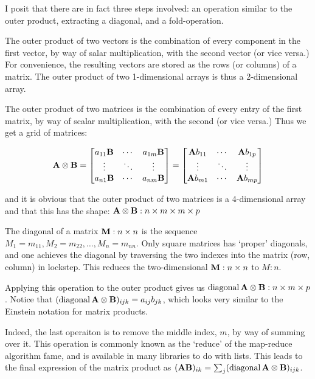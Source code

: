 \documentclass[a4paper,11pt,notitlepage]{article}
\begin{document}
I posit that there are in fact three steps involved: an operation similar to the outer product,
extracting a diagonal, and a fold-operation.

The outer product of two vectors is the combination of every component in the first vector,
by way of salar multiplication, with the second vector (or vice versa.) For convenience,
the resulting vectors are stored as the rows (or columns) of a matrix. The outer product
of two 1-dimensional arrays is thus a 2-dimensional array.

The outer product of two matrices is the combination of every entry of the first matrix, by
way of scalar multiplication, with the second (or vice versa.) Thus we get a grid of matrices:

\begin{align*}
  \bm{\mathrm{A}} \otimes \bm{\mathrm{B}} = \begin{bmatrix}
    a_{11} \bm{\mathrm{B}} & \cdots & a_{1m} \bm{\mathrm{B}} \\
    \vdots & \ddots & \vdots \\
    a_{n1} \bm{\mathrm{B}} & \cdots & a_{nm} \bm{\mathrm{B}} \\
  \end{bmatrix} = \begin{bmatrix}
    \bm{\mathrm{A}} b_{11} & \cdots & \bm{\mathrm{A}} b_{1p} \\
    \vdots & \ddots & \vdots \\
    \bm{\mathrm{A}} b_{m1} & \cdots & \bm{\mathrm{A}} b_{mp} \\
  \end{bmatrix}
\end{align*}

and it is obvious that the outer product of two matrices is a 4-dimensional array and
that this has the shape: \(\bm{\mathrm{A}} \otimes \bm{\mathrm{B}} : n \times m \times m \times p\)

The diagonal of a matrix \(\bm{\mathrm{M}} : n \times n\) is the sequence \(M_1 = m_{11}, M_2 = m_{22}, \dots, M_n = m_{nn}\).
Only square matrices has `proper' diagonals, and one achieves the diagonal by traversing the two indexes into the
matrix (row, column) in lockstep. This reduces the two-dimensional \(\bm{\mathrm{M}} : n \times n\) to \(M : n\).

Applying this operation to the outer product gives us \(\operatorname{diagonal}\bm{\mathrm{A}} \otimes \bm{\mathrm{B}} : n \times m \times p\).
Notice that \((\operatorname{diagonal} \bm{\mathrm{A}} \otimes \bm{\mathrm{B}})_{ijk} = a_{ij} b_{jk}\), which looks very similar to the
Einstein notation for matrix products.

Indeed, the last operaiton is to remove the middle index, \(m\), by way of summing over it. This operation is
commonly known as the `reduce' of the map-reduce algorithm fame, and is available in many libraries to do with
lists. This leads to the final expression of the matrix product as
\((\bm{\mathrm{A}} \bm{\mathrm{B}})_{ik} = \sum_{j} (\operatorname{diagonal} \bm{\mathrm{A}} \otimes \bm{\mathrm{B}})_{ijk}\). 
\end{document}
